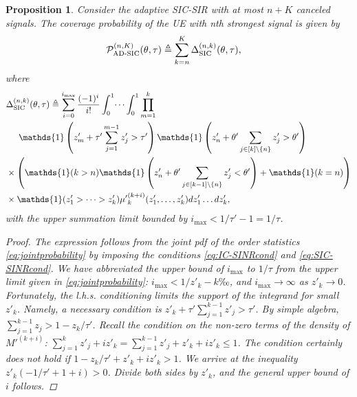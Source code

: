 \documentclass[lettersize,journal]{IEEEtran}
\newtheorem{prop}[theorem]{Proposition}
\begin{document}
\begin{prop}
  Consider the adaptive SIC-SIR with at most $n+K$ canceled signals. The coverage probability of the UE with n\textit{th} strongest signal is given by
  \begin{align}
    &\mathcal{P}^{(n,K)}_{\textup{AD-SIC}}(\theta,\tau) \triangleq \sum_{k=n}^{K}\Delta^{(n,k)}_{\textup{SIC}}(\theta,\tau),
  \end{align}
  where
  \begin{align}
    \label{eq:SICprob}
    & \Delta^{(n,k)}_{\textup{SIC}}(\theta,\tau) \triangleq \sum^{i_{\text{max}}}_{i=0}\frac{(-1)^i}{i!} \int_{0}^{1} \dots \int_{0}^{1}\prod_{m=1}^k  \nonumber \\
    &\hspace{0.5cm}\mathds{1}\left( z'_m+ \tau'\sum_{j=1}^{m-1} z'_j>\tau' \right)  \mathds{1}\left(z'_n+  \theta'\sum_{j\in [k] \setminus \{n\}} z'_j>\theta' \right) \nonumber \\
    &\times \left(\mathds{1}(k>n)\mathds{1}\left(z'_n+ \theta'\sum_{j \in [k-1] \setminus \{n\}} z'_j<\theta' \right) + \mathds{1}(k=n) \right) \nonumber\\
    & \times \mathds{1}(z'_1>\dots>z'_k){\mu'}_k^{(k+i)}(z'_1,\dots,z'_k) d z'_1 \dots d z'_k,
  \end{align}
  with the upper summation limit bounded by $i_{\text{max}} < 1/\tau'-1=1/\tau$.
  \begin{proof}
    The expression follows from the joint pdf of the order statistics \eqref{eq:jointprobability} by imposing the conditions \eqref{eq:IC-SINRcond} and \eqref{eq:SIC-SINRcond}. We have abbreviated the upper bound of $i_{\text{max}}$ to $1/\tau$ from the upper limit given in \eqref{eq:jointprobability}: $i_{\text{max}} < 1/z'_{k}-k‰$, and $i_{\text{max}} \rightarrow \infty$ as $z'_k \rightarrow 0$. Fortunately, the l.h.s. conditioning limits the support of the integrand for small $z'_k$. Namely, a necessary condition is $z'_{k}+\tau'\sum_{j=1}^{k-1}z'_{j}>\tau'$. By simple algebra, $\sum_{j=1}^{k-1}z_{j}> 1-z_{k}/\tau'$. Recall the condition on the non-zero terms of the density of $M'^{(k+i)}$:  $\sum_{j=1}^k z'_{j}+i z'_{k} =\sum_{j=1}^{k-1}z'_{j} +z'_{k}+i z'_{k}  \leq 1$. The condition certainly does \textit{not} hold if $1-z_{k}/\tau'+ z'_{k}+i z'_{k}>1$. We arrive at the inequality $z'_{k} \left(-1/\tau' + 1 +i \right)>0$. Divide both sides by $z'_{k}$, and the general upper bound of $i$ follows.
  \end{proof}
\end{prop}
\end{document}
